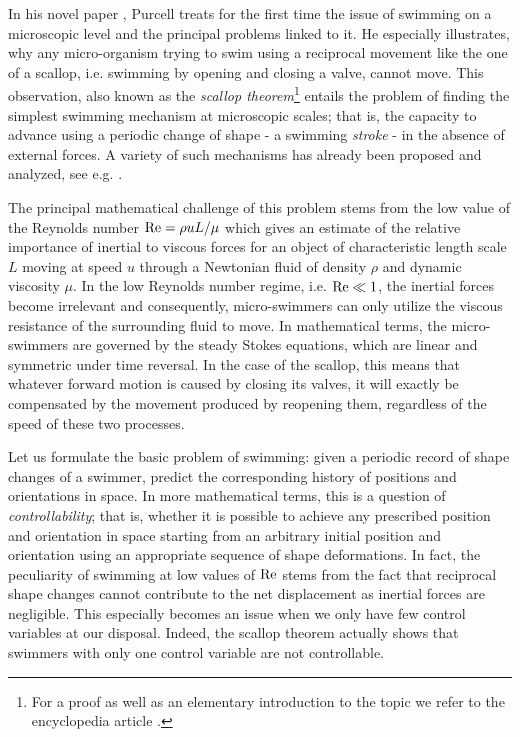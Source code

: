 
In his novel paper \cite{Purcell1977}, Purcell treats for the first time the issue of swimming on a microscopic level and the principal problems linked to it. He especially illustrates, why any micro-organism trying to swim using a reciprocal movement like the one of a scallop, i.e. swimming by opening and closing a valve, cannot move. This observation, also known as the \emph{scallop theorem}\footnote{For a proof as well as an elementary introduction to the topic we refer to the encyclopedia article \cite{DeSimone2011}.} entails the problem of finding the simplest swimming mechanism at microscopic scales; that is, the capacity to advance using a periodic change of  shape - a swimming \emph{stroke} - in  the absence of external forces. A variety of such mechanisms has already been proposed and analyzed, see e.g. \cite{Alouges2013, Najafi2004, Purcell1977}.


The principal mathematical challenge of this problem stems from the low value of the Reynolds number $\operatorname{Re} = \rho u L/\mu$ which gives an estimate of the relative importance of inertial to viscous forces for an object of characteristic length scale $L$ moving at speed $u$ through a Newtonian fluid of density $\rho$ and dynamic viscosity $\mu$. In the low Reynolds number regime, i.e. $\operatorname{Re} \ll 1$, the inertial forces become irrelevant and consequently, micro-swimmers can only utilize the viscous resistance of the surrounding fluid to move. In mathematical terms, the micro-swimmers are governed by the steady Stokes equations, which are linear and symmetric under time reversal. In the case of the scallop, this means that whatever forward motion is caused by closing its valves, it will exactly be compensated by the movement produced by reopening them, regardless of the speed of these two processes.

Let us formulate the basic problem of swimming: given a periodic record of shape changes of a swimmer, predict the corresponding history of positions and orientations in space. In more mathematical terms, this is a question of \emph{controllability}; that is, whether it is possible to achieve any prescribed position and orientation in space starting from an arbitrary initial position and orientation using an appropriate sequence of shape deformations. In fact, the peculiarity of swimming at low values of $\operatorname{Re}$ stems from the fact that reciprocal shape changes cannot contribute to the net displacement as inertial forces are negligible. This especially becomes an issue when we only have few control variables at our disposal. Indeed, the scallop theorem actually shows that swimmers with only one control variable are not controllable.

